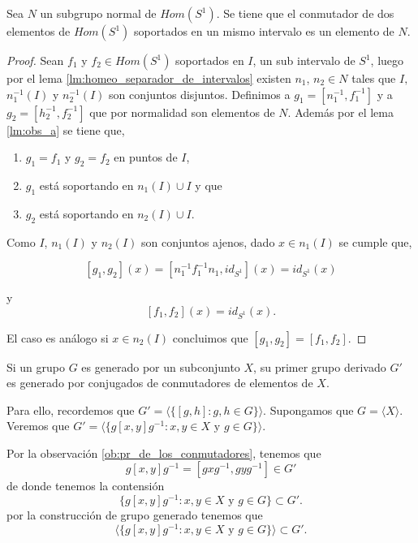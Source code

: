 
\begin{lm}
Sea $N$ un subgrupo normal de  $Hom(S^1)$. Se tiene que el conmutador de dos elementos de  $Hom(S^1)$ soportados en un mismo intervalo es un elemento de $N$.
\end{lm}

\begin{proof}	
Sean $f_1$ y $f_2 \in Hom(S^1)$  soportados en $I$, un sub intervalo de $S^1$, luego por el lema \ref{lm:homeo_separador_de_intervalos} existen  $n_1$, $n_2 \in N$ tales que $I,$ $n_1^{-1}(I)$ y $n_2^{-1}(I)$ son conjuntos disjuntos. Definimos a  $g_1=[n_1^{-1},f_1^{-1}]$ y a $g_2=[h_2^{-1},f_2^{-1}]$ que por  normalidad  son elementos de  $N$. Además por el lema \ref{lm:obs_a} se tiene que,

    \begin{enumerate}
        \item $g_1=f_1$  y $g_2=f_2$ en puntos de $I$, 
        \item $g_1$ está soportando en $n_1(I) \cup I$ y que 
        \item  $g_2$ está soportando en $n_2(I) \cup I$.
    \end{enumerate} 

Como $I$, $n_1(I)$ y $n_2(I)$ son conjuntos ajenos, dado $x \in n_1(I)$ se cumple que, 

$$[g_1,g_2](x)=[n_1^{-1}f_1^{-1}n_1,id_{S^1}](x)=id_{S^1}(x)$$

y $$[f_1,f_2](x)=id_{S^1}(x).$$

El caso es análogo si $x \in n_2(I)$ concluimos que $[g_1,g_2]=[f_1,f_2]$.
\end{proof}

\begin{ob}
Si un grupo $G$ es generado por un subconjunto $X$, su primer grupo derivado $G'$ es generado por conjugados de conmutadores de elementos de $X$.

Para ello, recordemos que $G'=\langle\{[g,h]: g, h \in G \} \rangle$. Supongamos que $G=\langle X \rangle.$ Veremos que $G'= \langle\{g[x,y]g^{-1}: x, y \in X \text{ y } g \in G \} \rangle$.

Por la observación \ref{ob:pr_de_los_conmutadores}, tenemos que
$$g[x,y]g^{-1}=[gxg^{-1},gyg^{-1}] \in G'$$
de donde tenemos la contensión 
$$ \{g[x,y]g^{-1}: x, y \in X \text{ y } g \in G \} \subset G'.$$
por la construcción de grupo generado tenemos que 
$$ \langle\{g[x,y]g^{-1}: x, y \in X \text{ y } g \in G \} \rangle \subset G'.$$
\end{ob}

